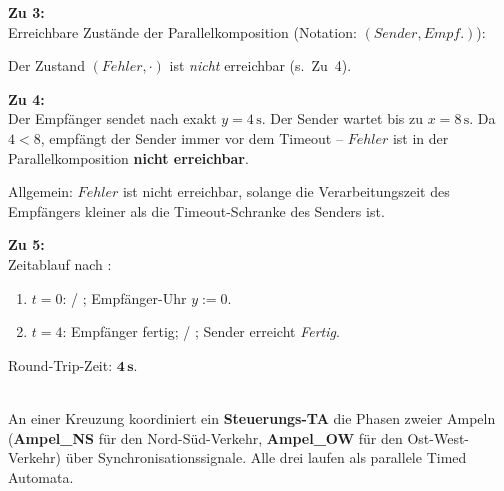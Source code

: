 \begin{loesung}
\textbf{Zu 3:}\\
Erreichbare Zustände der Parallelkomposition (Notation: $(\mathit{Sender}, \mathit{Empf.})$):

\begin{center}
\end{center}

Der Zustand $(\mathit{Fehler}, \cdot)$ ist \emph{nicht} erreichbar (s.\ Zu~4).

\textbf{Zu 4:}\\
Der Empfänger sendet  nach exakt $y = 4\,\text{s}$. Der Sender wartet bis zu
$x = 8\,\text{s}$. Da $4 < 8$, empfängt der Sender  immer vor dem Timeout --
$\mathit{Fehler}$ ist in der Parallelkomposition \textbf{nicht erreichbar}.

Allgemein: $\mathit{Fehler}$ ist nicht erreichbar, solange die Verarbeitungszeit des
Empfängers kleiner als die Timeout-Schranke des Senders ist.

\textbf{Zu 5:}\\
Zeitablauf nach :
\begin{enumerate}
  \item $t = 0$:  / ; Empfänger-Uhr $y := 0$.
  \item $t = 4$: Empfänger fertig;  / ; Sender erreicht \textit{Fertig}.
\end{enumerate}
Round-Trip-Zeit: $\mathbf{4\,\text{s}}$.
\end{loesung}

\umbruchlsg


\\
An einer Kreuzung koordiniert ein \textbf{Steuerungs-TA} die Phasen zweier Ampeln
(\textbf{Ampel\_NS} für den Nord-Süd-Verkehr, \textbf{Ampel\_OW} für den Ost-West-Verkehr)
über Synchronisationssignale. Alle drei laufen als parallele Timed Automata.

